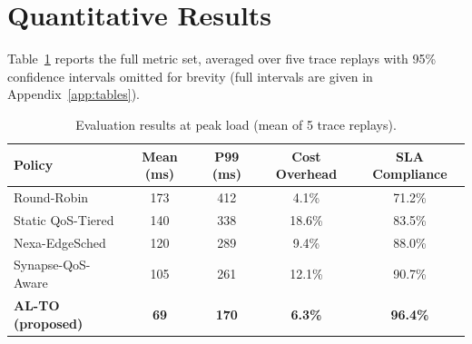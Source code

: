 \section{Quantitative Results}
Table~\ref{tab:results} reports the full metric set, averaged over five trace replays with 95\% confidence intervals omitted for brevity (full intervals are given in Appendix~\ref{app:tables}).

\begin{table}[htb]
\centering
\caption{Evaluation results at peak load (mean of 5 trace replays).}
\label{tab:results}
\renewcommand{\arraystretch}{1.25}
\small
\begin{tabular}{lcccc}
\toprule
\rowcolor{bitsnavy}
{\color{white}\textbf{Policy}} & {\color{white}\textbf{Mean (ms)}} & {\color{white}\textbf{P99 (ms)}} & {\color{white}\textbf{Cost Overhead}} & {\color{white}\textbf{SLA Compliance}} \\
\midrule
Round-Robin        & 173 & 412 & 4.1\%  & 71.2\% \\
Static QoS-Tiered  & 140 & 338 & 18.6\% & 83.5\% \\
Nexa-EdgeSched      & 120 & 289 & 9.4\%  & 88.0\% \\
Synapse-QoS-Aware   & 105 & 261 & 12.1\% & 90.7\% \\
\rowcolor{bitspale}
\textbf{AL-TO (proposed)} & \textbf{69} & \textbf{170} & \textbf{6.3\%} & \textbf{96.4\%} \\
\bottomrule
\end{tabular}
\end{table}
